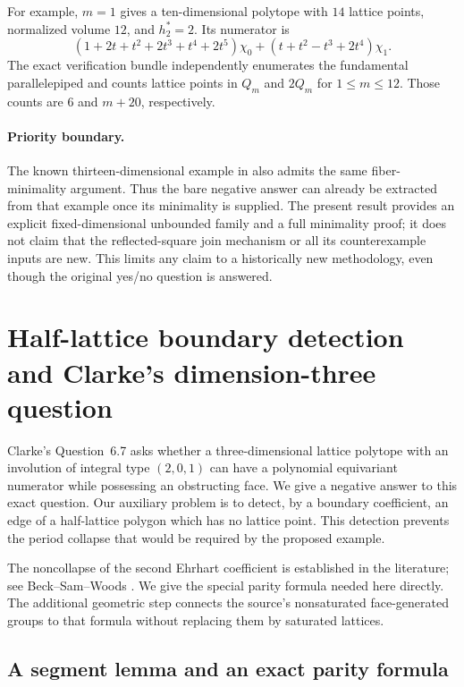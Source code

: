 \documentclass[11pt,a4paper]{article}
\theoremstyle{definition}\newtheorem{definition}[lemma]{Definition}
\theoremstyle{remark}\newtheorem{remark}[lemma]{Remark}
\begin{document}
For example, $m=1$ gives a ten-dimensional polytope with $14$ lattice
points, normalized volume $12$, and $h^*_2=2$. Its numerator is
\[
 (1+2t+t^2+2t^3+t^4+2t^5)\chi_0
       +(t+t^2-t^3+2t^4)\chi_1.
\]
The exact verification bundle independently enumerates the fundamental
parallelepiped and counts lattice points in $Q_m$ and $2Q_m$ for
$1\leq m\leq12$. Those counts are $6$ and $m+20$, respectively.

\paragraph{Priority boundary.}
The known thirteen-dimensional example in
\cite[Example~9.2]{Clarke26} also admits the same fiber-minimality
argument. Thus the bare negative answer can already be extracted from
that example once its minimality is supplied. The present result provides
an explicit fixed-dimensional unbounded family and a full minimality
proof; it does not claim that the reflected-square join mechanism or all
its counterexample inputs are new. This limits any claim to a historically
new methodology, even though the original yes/no question is answered.

\section{Half-lattice boundary detection and Clarke's dimension-three question}
\label{sec:half-lattice-boundary}

Clarke's Question~6.7 \cite{Clarke26} asks whether a three-dimensional
lattice polytope with an involution of integral type $(2,0,1)$ can have a
polynomial equivariant numerator while possessing an obstructing face.
We give a negative answer to this exact question. Our auxiliary problem is
to detect, by a boundary coefficient, an edge of a half-lattice polygon
which has no lattice point. This detection prevents the period collapse
that would be required by the proposed example.

The noncollapse of the second Ehrhart coefficient is established in the
literature; see Beck--Sam--Woods \cite{BeckSamWoods08}. We give the
special parity formula needed here directly. The additional geometric
step connects the source's nonsaturated face-generated groups to that
formula without replacing them by saturated lattices.

\subsection{A segment lemma and an exact parity formula}
\end{document}
